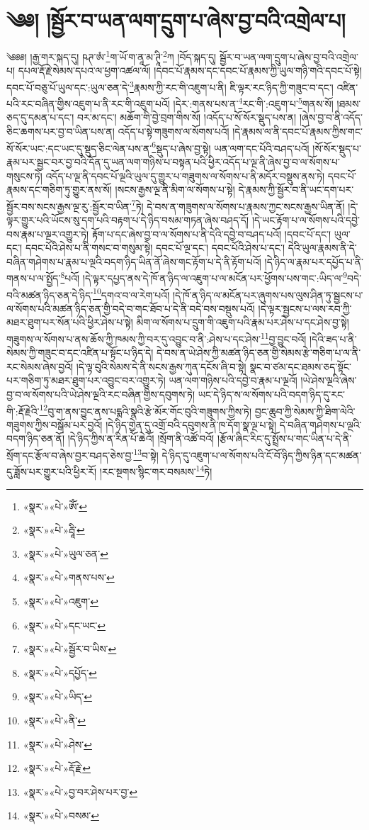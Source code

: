 \chapter{༄༅། །སྦྱོར་བ་ཡན་ལག་དྲུག་པ་ཞེས་བྱ་བའི་འགྲེལ་པ།}༄༅༅། །རྒྱ་གར་སྐད་དུ། ཥཊ་ཨཾ་\footnote{«སྣར་»«པེ་»ཨོཾ་}ག་ཡོ་ག་ནཱ་མ་ཊཱི་\footnote{«སྣར་»«པེ་»རྦཱི་}ཀ །བོད་སྐད་དུ། སྦྱོར་བ་ཡན་ལག་དྲུག་པ་ཞེས་བྱ་བའི་འགྲེལ་པ། དཔལ་རྡོ་རྗེ་སེམས་དཔའ་ལ་ཕྱག་འཚལ་ལོ། །དབང་པོ་རྣམས་དང་དབང་པོ་རྣམས་ཀྱི་ཡུལ་གཉི་གའི་དབང་པོ་སྟེ། དབང་པོ་བཅུ་པོ་ཡུལ་དང་:ཡུལ་ཅན་དེ་\footnote{«སྣར་»«པེ་»ཡུལ་ཅན་}རྣམས་ཀྱི་རང་གི་འཇུག་པ་ནི། ཇི་ལྟར་རང་ཉིད་ཀྱི་གཟུང་བ་དང་། འཛིན་པའི་རང་བཞིན་གྱིས་འཇུག་པ་ནི་རང་གི་འཇུག་པའོ། །དེར་:གནས་པས་ན་\footnote{«སྣར་»«པེ་»གནས་པས་}རང་གི་:འཇུག་པ་\footnote{«སྣར་»«པེ་»འཇུག་}གནས་སོ། །ཐམས་ཅད་དུ་དམན་པ་དང་། བར་མ་དང་། མཆོག་གི་བྱེ་བྲག་གིས་སོ། །འདོད་པ་སོ་སོར་སྡུད་པས་ན། །ཞེས་བྱ་བ་ནི་འདོད་ཅིང་ཆགས་པར་བྱ་བ་ཡིན་པས་ན། འདོད་པ་སྟེ་གཟུགས་ལ་སོགས་པའོ། །དེ་རྣམས་ལ་ནི་དབང་པོ་རྣམས་ཀྱིས་གང་སོ་སོར་ཡང་:དང་ཡང་དུ་སྡུད་ཅིང་ལེན་པས་ན་\footnote{«སྣར་»«པེ་»དང་ཡང་}སྡུད་པ་ཞེས་བྱ་སྟེ། ཡན་ལག་དང་པོའི་བཤད་པའོ། །སོ་སོར་སྡུད་པ་རྣམ་པར་སྦྱང་བར་བྱ་བའི་དོན་དུ་ཡན་ལག་གཉིས་པ་བསྟན་པའི་ཕྱིར་འདོད་པ་ལྔ་ནི་ཞེས་བྱ་བ་ལ་སོགས་པ་གསུངས་ཏེ། འདོད་པ་ལྔ་ནི་དབང་པོ་ལྔའི་ཡུལ་དུ་གྱུར་པ་གཟུགས་ལ་སོགས་པ་ནི་མདོར་བསྡུས་ནས་ཏེ། དབང་པོ་རྣམས་དང་གཅིག་ཏུ་གྱུར་ནས་སོ། །སངས་རྒྱས་ལྔ་ནི་མིག་ལ་སོགས་པ་སྟེ། དེ་རྣམས་ཀྱི་སྦྱོར་བ་ནི་ཡང་དག་པར་སྦྱོར་བས་སངས་རྒྱས་ལྔ་རུ་:སྦྱོར་བ་ཡིན་\footnote{«སྣར་»«པེ་»སྦྱོར་བ་ཡིས་}ཏེ། དེ་བས་ན་གཟུགས་ལ་སོགས་པ་རྣམས་ཀྱང་སངས་རྒྱས་ཡིན་ནོ། །དེ་ལྟར་གྱུར་པའི་ཡོངས་སུ་དག་པའི་བརྟག་པ་དེ་ཉིད་བསམ་གཏན་ཞེས་བཤད་དོ། །དེ་ཡང་རྟོག་པ་ལ་སོགས་པའི་དབྱེ་བས་རྣམ་པ་ལྔར་འགྱུར་ཏེ། རྟོག་པ་དང་ཞེས་བྱ་བ་ལ་སོགས་པ་ནི་དེའི་དབྱེ་བ་བཤད་པའོ། །དབང་པོ་དང་། ཡུལ་དང་། དབང་པོའི་ཤེས་པ་ནི་གསང་བ་གསུམ་སྟེ། དབང་པོ་ལྔ་དང་། དབང་པོའི་ཤེས་པ་དང་། དེའི་ཡུལ་རྣམས་ནི་དེ་བཞིན་གཤེགས་པ་རྣམ་པ་ལྔའི་བདག་ཉིད་ཡིན་ནོ་ཞེས་གང་རྟོག་པ་དེ་ནི་རྟོག་པའོ། །དེ་ཉིད་ལ་རྣམ་པར་དཔྱོད་པ་ནི་གནས་པ་ལ་སྤྱོད་\footnote{«སྣར་»«པེ་»དཔྱོད་}པའོ། །དེ་ལྟར་དཔྱད་ནས་དེ་ཁོ་ན་ཉིད་ལ་འཇུག་པ་ལ་མངོན་པར་ཕྱོགས་པས་གང་:ཡིད་ལ་\footnote{«སྣར་»«པེ་»ཡིད་}བདེ་བའི་མཚན་ཉིད་ཅན་དེ་ཉིད་\footnote{«སྣར་»«པེ་»ནི་}དགའ་བ་ལ་རེག་པའོ། །དེ་ཁོ་ན་ཉིད་ལ་མངོན་པར་ཞུགས་པས་ལུས་ཤིན་ཏུ་སྦྱངས་པ་ལ་སོགས་པའི་མཚན་ཉིད་ཅན་གྱི་བདེ་བ་གང་ཐོབ་པ་དེ་ནི་བདེ་བས་བསྡུས་པའོ། །དེ་ལྟར་སྦྱངས་པ་ལས་རབ་ཀྱི་མཐར་ཐུག་པར་སོན་པའི་ཕྱིར་ཤེས་པ་སྟེ། མིག་ལ་སོགས་པ་དྲུག་གི་འཇུག་པའི་རྣམ་པར་ཤེས་པ་དང་ཤེས་བྱ་སྟེ། གཟུགས་ལ་སོགས་པ་ནས་ཆོས་ཀྱི་ཁམས་ཀྱི་བར་དུ་འབྱུང་བ་ནི་:ཤེས་པ་དང་ཤེས་\footnote{«སྣར་»«པེ་»ཤེས་}བྱ་བྱུང་བའོ། །དེའི་ཟད་པ་ནི་སེམས་ཀྱི་གཟུང་བ་དང་འཛིན་པ་སྟོང་པ་ཉིད་དེ། དེ་བས་ན་ཡེ་ཤེས་ཀྱི་མཚན་ཉིད་ཅན་གྱི་སེམས་རྩེ་གཅིག་པ་ལ་ནི་རང་སེམས་ཞེས་བྱའོ། །དེ་ལྟ་བུའི་སེམས་དེ་ནི་སངས་རྒྱས་ཀུན་དངོས་ཞི་བ་སྟེ། སྣང་བ་ཙམ་དང་ཐམས་ཅད་སྟོང་པར་གཅིག་ཏུ་མཐར་ཐུག་པར་འབྱུང་བར་འགྱུར་ཏེ། ཡན་ལག་གཉིས་པའི་དབྱེ་བ་རྣམ་པ་ལྔའོ། །ཡེ་ཤེས་ལྔའི་ཞེས་བྱ་བ་ལ་སོགས་པའི་ཡེ་ཤེས་ལྔའི་རང་བཞིན་གྱིས་དབུགས་ཏེ། ཡང་དེ་ཉིད་ས་ལ་སོགས་པའི་བདག་ཉིད་དུ་རང་གི་:རྡོ་རྗེའི་\footnote{«སྣར་»«པེ་»རྡོ་རྗེ་}བུ་ག་ནས་བྱུང་ནས་པདྨའི་སྣའི་རྩེ་མོར་གོང་བུའི་གཟུགས་ཀྱིས་ཏེ། བྱང་ཆུབ་ཀྱི་སེམས་ཀྱི་ཐིག་ལེའི་གཟུགས་ཀྱིས་བསྒོམ་པར་བྱའོ། །དེ་ཉིད་གྱེན་དུ་འགྲོ་བའི་དབུགས་ནི་ཁ་དོག་སྣ་ལྔ་པ་སྟེ། དེ་བཞིན་གཤེགས་པ་ལྔའི་བདག་ཉིད་ཅན་ནོ། །དེ་ཉིད་ཀྱིས་ན་རིན་པོ་ཆེའོ། །སྲོག་ནི་འཚོ་བའོ། །རྩོལ་ཞིང་རིང་དུ་སྤྲོས་པ་གང་ཡིན་པ་དེ་ནི་སྲོག་དང་རྩོལ་བ་ཞེས་བྱར་བཤད་ཅེས་བྱ་\footnote{«སྣར་»«པེ་»བྱ་བར་ཤེས་པར་བྱ་}བ་སྟེ། དེ་ཉིད་དུ་འཇུག་པ་ལ་སོགས་པའི་ངོ་བོ་ཉིད་ཀྱིས་ཉིན་དང་མཚན་དུ་ཟློས་པར་གྱུར་པའི་ཕྱིར་རོ། །རང་སྔགས་སྙིང་གར་བསམས་\footnote{«སྣར་»«པེ་»བསམ་}ཏེ། 